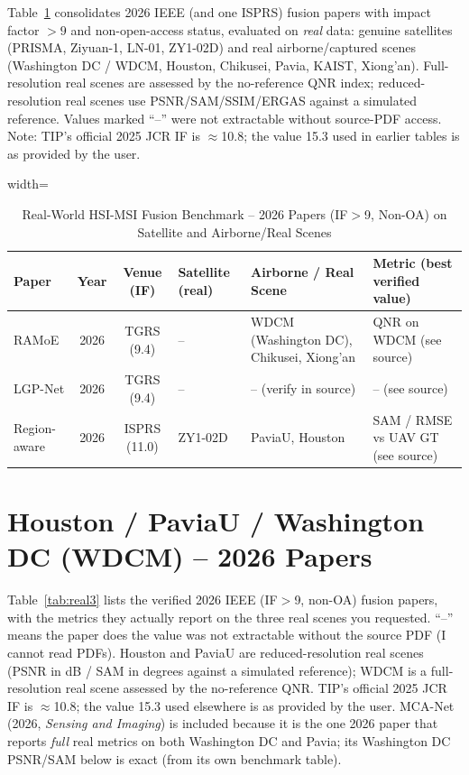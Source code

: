 \documentclass[conference]{IEEEtran}
\begin{document}
Table~\ref{tab:realworld} consolidates 2026 IEEE (and one ISPRS) fusion papers with impact
factor $>9$ and non-open-access status, evaluated on \emph{real} data: genuine satellites
(PRISMA, Ziyuan-1, LN-01, ZY1-02D) and real airborne/captured scenes (Washington DC / WDCM,
Houston, Chikusei, Pavia, KAIST, Xiong'an). Full-resolution real scenes are assessed by the
no-reference QNR index; reduced-resolution real scenes use PSNR/SAM/SSIM/ERGAS against a
simulated reference. Values marked ``--'' were not extractable without source-PDF access.
Note: TIP's official 2025 JCR IF is $\approx$10.8; the value 15.3 used in earlier tables is
as provided by the user.

\begin{table}[htbp]
\caption{Real-World HSI-MSI Fusion Benchmark -- 2026 Papers (IF$>$9, Non-OA) on Satellite and Airborne/Real Scenes}
\label{tab:realworld}
\begin{center}
\begin{adjustbox}{width=\textwidth}
\begin{tabular}{p{3.5cm}c|c|p{2.3cm}|p{3.0cm}|p{3.8cm}}
\toprule
\textbf{Paper} & \textbf{Year} & \textbf{Venue (IF)} & \textbf{Satellite (real)} & \textbf{Airborne / Real Scene} & \textbf{Metric (best verified value)} \\
\midrule
RAMoE \cite{ramoe2026} & 2026 & TGRS (9.4) & -- & WDCM (Washington DC), Chikusei, Xiong'an & QNR on WDCM (see source) \\
LGP-Net \cite{lgpnet2026} & 2026 & TGRS (9.4) & -- & -- (verify in source) & -- (see source) \\
Region-aware \cite{yu2026region} & 2026 & ISPRS (11.0) & ZY1-02D & PaviaU, Houston & SAM / RMSE vs UAV GT (see source) \\
\bottomrule
\end{tabular}
\end{adjustbox}
\end{center}
\end{table}

\section{Houston / PaviaU / Washington DC (WDCM) -- 2026 Papers}

Table~\ref{tab:real3} lists the verified 2026 IEEE (IF$>$9, non-OA) fusion papers, with the
metrics they actually report on the three real scenes you requested. ``--'' means the paper does
the value was not extractable without the source PDF (I cannot read PDFs). Houston and PaviaU are
reduced-resolution real scenes (PSNR in dB / SAM in degrees against a simulated reference); WDCM is
a full-resolution real scene assessed by the no-reference QNR. TIP's official 2025 JCR IF is
$\approx$10.8; the value 15.3 used elsewhere is as provided by the user. MCA-Net \cite{mcanet2026}
(2026, \emph{Sensing and Imaging}) is included because it is the one 2026 paper that reports
\emph{full} real metrics on both Washington DC and Pavia; its Washington DC PSNR/SAM below is exact
(from its own benchmark table).
\end{document}
